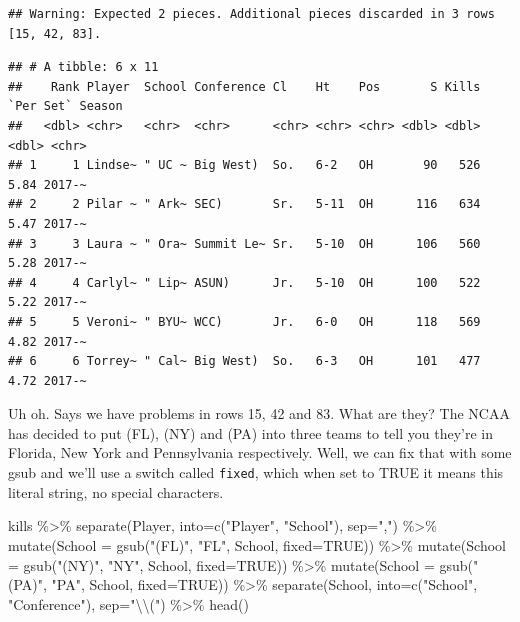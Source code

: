 \documentclass[
]{book}
\newenvironment{Shaded}{\begin{snugshade}}{\end{snugshade}}
\newcommand{\AttributeTok}[1]{\textcolor[rgb]{0.77,0.63,0.00}{#1}}
\newcommand{\ConstantTok}[1]{\textcolor[rgb]{0.00,0.00,0.00}{#1}}
\newcommand{\FunctionTok}[1]{\textcolor[rgb]{0.00,0.00,0.00}{#1}}
\newcommand{\NormalTok}[1]{#1}
\newcommand{\SpecialCharTok}[1]{\textcolor[rgb]{0.00,0.00,0.00}{#1}}
\newcommand{\StringTok}[1]{\textcolor[rgb]{0.31,0.60,0.02}{#1}}
\begin{document}
\begin{verbatim}
## Warning: Expected 2 pieces. Additional pieces discarded in 3 rows [15, 42, 83].
\end{verbatim}

\begin{verbatim}
## # A tibble: 6 x 11
##    Rank Player  School Conference Cl    Ht    Pos       S Kills `Per Set` Season
##   <dbl> <chr>   <chr>  <chr>      <chr> <chr> <chr> <dbl> <dbl>     <dbl> <chr> 
## 1     1 Lindse~ " UC ~ Big West)  So.   6-2   OH       90   526      5.84 2017-~
## 2     2 Pilar ~ " Ark~ SEC)       Sr.   5-11  OH      116   634      5.47 2017-~
## 3     3 Laura ~ " Ora~ Summit Le~ Sr.   5-10  OH      106   560      5.28 2017-~
## 4     4 Carlyl~ " Lip~ ASUN)      Jr.   5-10  OH      100   522      5.22 2017-~
## 5     5 Veroni~ " BYU~ WCC)       Jr.   6-0   OH      118   569      4.82 2017-~
## 6     6 Torrey~ " Cal~ Big West)  So.   6-3   OH      101   477      4.72 2017-~
\end{verbatim}

Uh oh. Says we have problems in rows 15, 42 and 83. What are they? The NCAA has decided to put (FL), (NY) and (PA) into three teams to tell you they're in Florida, New York and Pennsylvania respectively. Well, we can fix that with some gsub and we'll use a switch called \texttt{fixed}, which when set to TRUE it means this literal string, no special characters.

\begin{Shaded}
\begin{Highlighting}[]
\NormalTok{kills }\SpecialCharTok{\%\textgreater{}\%} 
  \FunctionTok{separate}\NormalTok{(Player, }\AttributeTok{into=}\FunctionTok{c}\NormalTok{(}\StringTok{"Player"}\NormalTok{, }\StringTok{"School"}\NormalTok{), }\AttributeTok{sep=}\StringTok{","}\NormalTok{) }\SpecialCharTok{\%\textgreater{}\%} 
  \FunctionTok{mutate}\NormalTok{(}\AttributeTok{School =} \FunctionTok{gsub}\NormalTok{(}\StringTok{"(FL)"}\NormalTok{, }\StringTok{"FL"}\NormalTok{, School, }\AttributeTok{fixed=}\ConstantTok{TRUE}\NormalTok{)) }\SpecialCharTok{\%\textgreater{}\%}
  \FunctionTok{mutate}\NormalTok{(}\AttributeTok{School =} \FunctionTok{gsub}\NormalTok{(}\StringTok{"(NY)"}\NormalTok{, }\StringTok{"NY"}\NormalTok{, School, }\AttributeTok{fixed=}\ConstantTok{TRUE}\NormalTok{)) }\SpecialCharTok{\%\textgreater{}\%}
  \FunctionTok{mutate}\NormalTok{(}\AttributeTok{School =} \FunctionTok{gsub}\NormalTok{(}\StringTok{"(PA)"}\NormalTok{, }\StringTok{"PA"}\NormalTok{, School, }\AttributeTok{fixed=}\ConstantTok{TRUE}\NormalTok{)) }\SpecialCharTok{\%\textgreater{}\%}
  \FunctionTok{separate}\NormalTok{(School, }\AttributeTok{into=}\FunctionTok{c}\NormalTok{(}\StringTok{"School"}\NormalTok{, }\StringTok{"Conference"}\NormalTok{), }\AttributeTok{sep=}\StringTok{"}\SpecialCharTok{\textbackslash{}\textbackslash{}}\StringTok{("}\NormalTok{) }\SpecialCharTok{\%\textgreater{}\%} 
  \FunctionTok{head}\NormalTok{()}
\end{Highlighting}
\end{Shaded}
\end{document}
